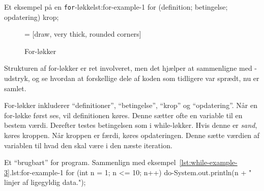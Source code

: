		\begin{JavaCode}{Et eksempel på en \texttt{for}-løkke}{lst:for-example-1}
			for (definition; betingelse; opdatering) {
				krop;
			}
		\end{JavaCode}

        \begin{figure}
        \center
         = [draw, very thick, rounded corners]
        \caption{For-løkker}
        \label{fig:for-loop-illustrated}
        \end{figure}

		Strukturen af for-løkker er ret involveret, men det hjælper at
		sammenligne med -udstryk, og se hvordan at forskellige
		dele af koden som tidligere var sprædt, nu er samlet.

        For-løkker inkluderer ``definitioner'', ``betingelse'',
        ``krop'' og ``opdatering''. Når en for-løkke først ses, vil
        definitionen køres. Denne sætter ofte en variable til en
        bestem værdi. Derefter testes betingelsen som i while-løkker.
        Hvis denne er \emph{sand}, køres kroppen. Når kroppen er
        færdi, køres opdateringen. Denne sætte værdien af variablen
        til hvad den skal være i den næste iteration.

		\begin{JavaCode}{Et ``brugbart'' for program. Sammenlign med eksempel~\ref{lst:while-example-3}.}{lst:for-example-1}
			for (int n = 1; n <= 10; n++) {
				do-System.out.println(n + " linjer af ligegyldig data.");
			}
		\end{JavaCode}

